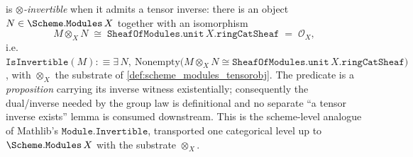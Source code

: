 \begin{definition}
  is \emph{\(\otimes\)-invertible} when it admits a tensor inverse: there is an
  object \(N \in \Scheme.\mathtt{Modules}\,X\) together with an isomorphism
  \[
    M \otimes_X N \;\cong\;
      \mathtt{SheafOfModules.unit}\,X.\mathtt{ringCatSheaf}
      \;=\; \mathcal{O}_X ,
  \]
  i.e.\ \(\mathtt{IsInvertible}(M) :\equiv \exists\, N,\
  \mathrm{Nonempty}\bigl(M \otimes_X N \cong
  \mathtt{SheafOfModules.unit}\,X.\mathtt{ringCatSheaf}\bigr)\), with
  \(\otimes_X\) the substrate of \cref{def:scheme_modules_tensorobj}. The
  predicate is a \emph{proposition} carrying its inverse witness existentially;
  consequently the dual/inverse needed by the group law is definitional and no
  separate ``a tensor inverse exists'' lemma is consumed downstream. This is the
  scheme-level analogue of Mathlib's \(\mathtt{Module.Invertible}\), transported
  one categorical level up to \(\Scheme.\mathtt{Modules}\,X\) with the substrate
  \(\otimes_X\).
\end{definition}

